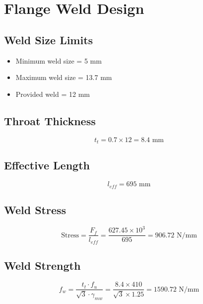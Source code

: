 \section{Flange Weld Design}

\subsection{Weld Size Limits}

\begin{itemize}
    \item Minimum weld size = 5 mm
    \item Maximum weld size = 13.7 mm
    \item Provided weld = 12 mm
\end{itemize}

\subsection{Throat Thickness}

\begin{equation}
t_t = 0.7 \times 12 = 8.4 \text{ mm}
\end{equation}

\subsection{Effective Length}

\begin{equation}
l_{eff} = 695 \text{ mm}
\end{equation}

\subsection{Weld Stress}

\begin{equation}
\text{Stress} = \frac{F_f}{l_{eff}} = \frac{627.45 \times 10^3}{695} = 906.72 \text{ N/mm}
\end{equation}

\subsection{Weld Strength}

\begin{equation}
f_w = \frac{t_t \cdot f_u}{\sqrt{3} \cdot \gamma_{mw}}
= \frac{8.4 \times 410}{\sqrt{3} \times 1.25}
= 1590.72 \text{ N/mm}
\end{equation}

